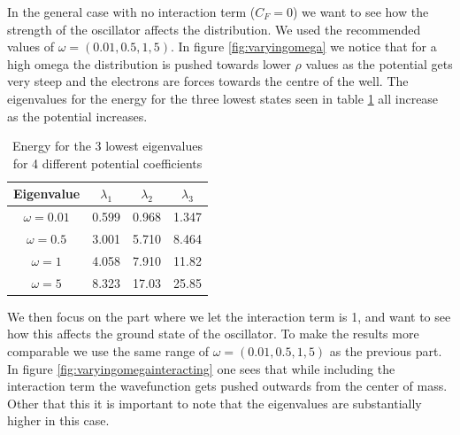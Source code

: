 \documentclass[a4paper,11pt]{article}
\begin{document}
{%
In the general case with no interaction term ($C_F = 0$) we want to see how the strength of the oscillator affects the distribution. We used the recommended values of $\omega = (0.01, 0.5, 1, 5)$. In figure \ref{fig:varyingomega} we notice that for a high omega the distribution is pushed towards lower $\rho$ values as the potential gets very steep and the electrons are forces towards the centre of the well. The eigenvalues for the energy for the three lowest states seen in table \ref{tab:varying_omega} all increase as the potential increases.

\begin{table}
\caption{Energy for the 3 lowest eigenvalues for 4 different potential coefficients}
\begin{center}
\begin{tabular}{|c||c|c|c|}
\hline
Eigenvalue & $\lambda_1$ & $\lambda_2$ & $\lambda_3$ \\
\hline
\hline
$\omega=0.01$ & 0.599 & 0.968 & 1.347  \\
\hline
$\omega=0.5$ & 3.001 & 5.710 & 8.464 \\
\hline
$\omega=1$ & 4.058 & 7.910 & 11.82 \\
\hline
$\omega=5$ & 8.323 & 17.03 & 25.85 \\
\hline
\end{tabular}
\end{center}
\label{tab:varying_omega}
\end{table}%


We then focus on the part where we let the interaction term is 1, and want to see how this affects the ground state of the oscillator. To make the results more comparable we use the same range of $\omega = (0.01, 0.5, 1, 5)$ as the previous part. In figure \ref{fig:varyingomegainteracting} one sees that while including the interaction term the wavefunction gets pushed outwards from the center of mass. Other that this it is important to note that the eigenvalues are substantially higher in this case. 


}
\end{document}

